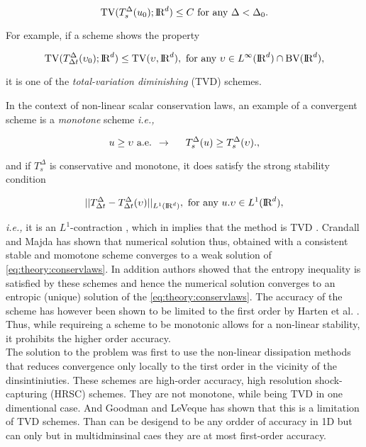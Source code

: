 \documentclass[11pt,a4paper,headinclude=true,DIV=14,BCOR=8mm,chapterprefix,listof=totoc,twoside,openright,abstracton]{scrbook}
\begin{document}
\begin{equation}
    \text{TV}(T_s ^{\Delta}(u_0); \text{I\!R}^d)\leq C \text{ for any } \Delta < \Delta_0.
\end{equation}

For example, if a scheme shows the property 

\begin{equation}
    \text{TV}(T_{\Delta t} ^{\Delta}(\upsilon_0); \text{I\!R}^d) \leq \text{TV}(\upsilon,  \text{I\!R}^d), \text{ for any } \upsilon\in L^{\infty}(\text{I\!R}^d)\cap \text{BV}(\text{I\!R}^d),
\end{equation}

it is one of the \textit{total-variation diminishing} (TVD) schemes. 

In the context of non-linear scalar conservation laws, an example of a convergent scheme is a \textit{monotone} scheme \textit{i.e.,}

\begin{equation}
    u \geq \upsilon \text{ a.e. } \rightarrow \hspace{5mm} T_{s}^{\Delta}(u) \geq T_{s}^{\Delta}(\upsilon).,
\end{equation}

and if $T_{s}^{\Delta}$ is conservative and monotone, it does satisfy the strong stability condition 

\begin{equation}
    || T^{\Delta} _{\Delta t} - T^{\Delta} _{\Delta t}(\upsilon)||_{L^1(\text{I\!R}^d)}, \text{  for any  } u.\upsilon\in L^1(\text{I\!R}^d),
\end{equation}

\textit{i.e.,} it is an $L^1$-contraction \cite{Crandall:1980proc}, which in implies that the method is TVD \cite{LeVeque:1992}. Crandall and Majda \cite{Crandall:1980} has shown that numerical solution thus, obtained with a consistent stable and momotone scheme converges to a weak solution of \ref{eq:theory:conservlaws}. In addition authors showed that the entropy inequality is satisfied by these schemes and hence the numerical solution converges to an entropic (unique) solution of the \ref{eq:theory:conservlaws}. The accuracy of the scheme has however been shown to be limited to the first order by Harten et al. \cite{Harten:1976}. Thus, while requireing a scheme to be monotonic allows for a non-linear stability, it prohibits the higher order accuracy.\\

The solution to the problem was first to use the non-linear dissipation methods that reduces convergence only locally to the tirst order in the vicinity of the dinsintiniuties. These schemes are high-order accuracy, high resolution shock-capturing (HRSC) schemes. They are not monotone, while being TVD in one dimentional case. And Goodman and LeVeque \cite{Goodman:1985} has shown that this is a limitation of TVD schemes. Than can be desigend to be any ordder of accuracy in 1D but can only but in multidminsinal caes they are at most first-order accuracy. \\
\end{document}
